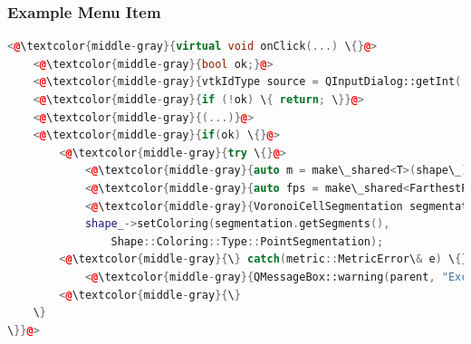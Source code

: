 \documentclass[compress]{beamer}
\begin{document}
\begin{frame}[fragile]
  \frametitle{Example Menu Item}
  
\begin{lstlisting}[language=C++, keywordstyle=\color{blue},
                stringstyle=\color{red},
                commentstyle=\color{green}, numbers=none]
<@\textcolor{middle-gray}{virtual void onClick(...) \{}@>
    <@\textcolor{middle-gray}{bool ok;}@>
    <@\textcolor{middle-gray}{vtkIdType source = QInputDialog::getInt(...);}@>
    <@\textcolor{middle-gray}{if (!ok) \{ return; \}}@>
    <@\textcolor{middle-gray}{(...)}@>
    <@\textcolor{middle-gray}{if(ok) \{}@>
        <@\textcolor{middle-gray}{try \{}@>
            <@\textcolor{middle-gray}{auto m = make\_shared<T>(shape\_);}@>
            <@\textcolor{middle-gray}{auto fps = make\_shared<FarthestPointSampling>(shape\_, m, source, numberOfSegments);}@>
            <@\textcolor{middle-gray}{VoronoiCellSegmentation segmentation(shape\_, m, fps);}@>
            shape_->setColoring(segmentation.getSegments(), 
            	Shape::Coloring::Type::PointSegmentation);
        <@\textcolor{middle-gray}{\} catch(metric::MetricError\& e) \{}@>
            <@\textcolor{middle-gray}{QMessageBox::warning(parent, "Exception", e.what());}@>
        <@\textcolor{middle-gray}{\}
    \}
\}}@>
\end{lstlisting}

\end{frame}
\end{document}
